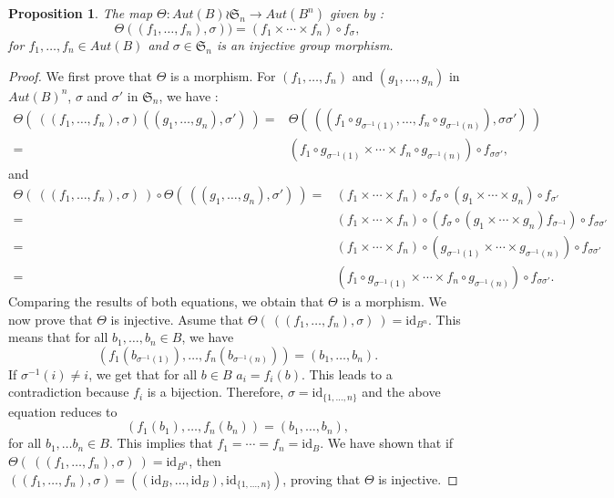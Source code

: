 \documentclass[12pt, reqno]{amsart}
\newtheorem{proposition}[theorem]{Proposition}
\begin{document}
\begin{proposition}
The map $\Theta : Aut(B) \wr \mathfrak{S}_n \to Aut(B^n)$ given by : 
$$ \Theta((f_1,\dots,f_n),\sigma))=(f_1\times \cdots \times f_n)\circ f_\sigma,$$
for $f_1,\dots , f_n\in Aut(B)$ and $\sigma \in \mathfrak{S}_n$ is an injective group morphism.
\end{proposition}
\begin{proof}
We first prove that $\Theta$ is a morphism. For $(f_1,\dots,f_n)$ and $(g_1,\dots, g_n) $ in $Aut(B)^n $, $\sigma$ and $\sigma'$ in $\mathfrak{S}_n$, we have : 
$$\begin{aligned}
\Theta(\ ((f_1,\dots,f_n), \sigma) ((g_1,\dots,g_n),\sigma ') \ ) =&\Theta(\ ((f_1\circ g_{\sigma^{-1}(1)},\dots,f_n\circ g_{\sigma^{-1}(n)}),\sigma\sigma ') \ )\\
=&(f_1\circ g_{\sigma^{-1}(1)}\times \cdots \times f_n\circ g_{\sigma^{-1}(n)}) \circ f_{\sigma\sigma '},
\end{aligned}$$
and 
$$\begin{aligned}
\Theta(\ ((f_1,\dots,f_n), \sigma) \ ) \circ \Theta(\ ((g_1,\dots,g_n),\sigma ') \ ) =&(f_1\times \cdots \times f_n)\circ f_\sigma \circ (g_1\times \cdots \times g_n)\circ f_{\sigma'}\\
=&(f_1\times \cdots \times f_n)\circ (f_\sigma \circ (g_1\times \cdots \times g_n) f_{\sigma^{-1}})\circ f_{\sigma\sigma'} \\
=&(f_1\times \cdots \times f_n)\circ ( g_{\sigma^{-1}(1)}\times \cdots \times g_{\sigma^{-1}(n)})\circ f_{\sigma\sigma'}\\
=&(f_1\circ g_{\sigma^{-1}(1)}\times \cdots \times f_n\circ g_{\sigma^{-1}(n)}) \circ f_{\sigma\sigma '}.
\end{aligned}$$
Comparing the results of both equations, we obtain that $\Theta$ is a morphism. We now prove that $\Theta $ is injective. Asume that $\Theta(\ ((f_1,\dots,f_n), \sigma) \ ) =\text{id}_{B^n}$. This means that for all $b_1,\dots,b_n \in B$, we have 
$$ (f_1(b_{\sigma^{-1}(1)}),\dots, f_n(b_{\sigma^{-1}(n)}))=(b_1,\dots,b_n).$$ 
If $\sigma ^{-1}(i) \neq i$, we get that for all $b\in B$ $a_i=f_i(b)$. This leads to a contradiction because $f_i$ is a bijection. Therefore, $\sigma=\text{id}_{\{1,\dots, n \}}$ and the above equation reduces to  
$$(f_1(b_1),\dots, f_n(b_n))=(b_1,\dots,b_n), $$
for all $b_1,\dots b_n \in B$. This implies that $f_1=\cdots= f_n= \text{id}_B$. We have shown that if $\Theta(\ ((f_1,\dots,f_n), \sigma) \ ) =\text{id}_{B^n}$, then $((f_1,\dots,f_n),\sigma)=((\text{id}_B,\dots, \text{id}_B),\text{id}_{\{1,\dots,n\}})$, proving that $\Theta$ is injective.
\end{proof}
\end{document}
